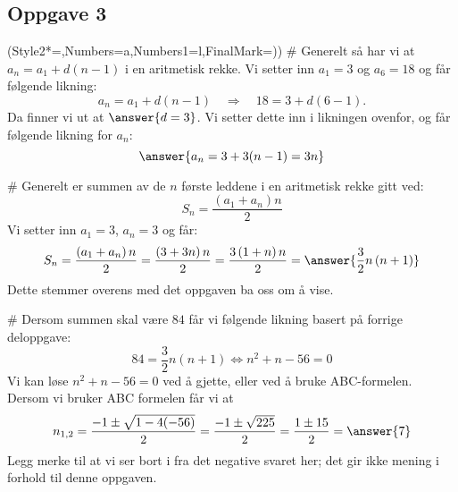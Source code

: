 \subsection*{Oppgave 3}
\begin{easylist}[enumerate]
	\ListProperties(Style2*=,Numbers=a,Numbers1=l,FinalMark={)})
	# Generelt så har vi at $a_n = a_1 + d(n-1)$ i en aritmetisk rekke. Vi setter inn $a_1 = 3$ og $a_6 = 18$ og
	får følgende likning:
	\begin{equation*}
		a_n = a_1 + d(n-1) \quad \Rightarrow \quad 18 = 3 + d(6-1).
	\end{equation*}
	Da finner vi ut at $\answer{d = 3}$. Vi setter dette inn i likningen ovenfor, og får følgende likning for $a_n$:
	\begin{equation*}
		\answer{a_n = 3 + 3(n-1) = 3n}
	\end{equation*}
	
	# Generelt er summen av de $n$ første leddene i en aritmetisk rekke gitt ved:
	\begin{equation*}
		S_n = \frac{\left(a_1 + a_n\right)n}{2}
	\end{equation*}
	Vi setter inn $a_1 = 3$, $a_n = 3$ og får:
	\begin{equation*}
		S_n = \frac{\left(a_1 + a_n\right)n}{2} = \frac{\left(3 + 3n\right)n}{2} = 
		\frac{3\left(1 + n\right)n}{2} = \answer{\frac{3}{2} n \left(n+1\right)}
	\end{equation*}
	Dette stemmer overens med det oppgaven ba oss om å vise.
	
	# Dersom summen skal være $84$ får vi følgende likning basert på forrige deloppgave:
	\begin{equation*}
		84 = \frac{3}{2} n \left(n+1\right) \Leftrightarrow n^2 + n - 56 = 0
	\end{equation*}
	Vi kan løse $n^2 + n - 56 = 0$ ved å gjette, eller ved å bruke ABC-formelen. Dersom vi bruker ABC formelen får vi at
	\begin{equation*}
		n_{1,2} = \frac{-1 \pm \sqrt{1 - 4 (-56)}}{2} = \frac{-1 \pm \sqrt{225}}{2} = 
		\frac{1 \pm 15}{2} = \answer{7}
	\end{equation*}
	Legg merke til at vi ser bort i fra det negative svaret her; det gir ikke mening i forhold til denne oppgaven.
\end{easylist}

